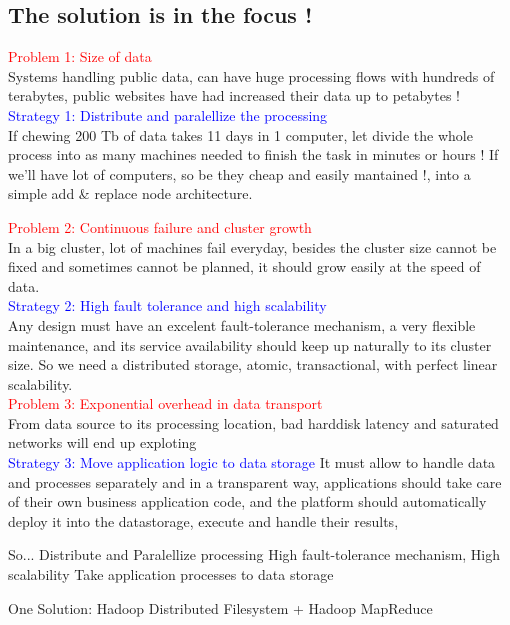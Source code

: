 \subsection{The solution is in the focus !}
\textcolor{red} {Problem 1: Size of data} \\
Systems handling public data, can have huge processing flows with hundreds of terabytes, public websites have had increased their data up to petabytes ! \\
\textcolor{blue} {Strategy 1: Distribute and paralellize the processing} \\
If chewing 200 Tb of data takes 11 days in 1 computer, let divide the whole process into as many machines needed to finish the task in minutes or hours !
If we'll have lot of computers, so be they cheap and easily mantained !, into a simple add \& replace node architecture.

\textcolor{red} {Problem 2: Continuous failure and cluster growth} \\
In a big cluster, lot of machines fail everyday, besides the cluster size cannot be fixed and sometimes cannot be planned, it should grow easily at the speed of data. \\
\textcolor{blue} {Strategy 2: High fault tolerance and high scalability} \\
Any design must have an excelent fault-tolerance mechanism, a very flexible maintenance, and its service availability should keep up naturally to its cluster size.
So we need a distributed storage, atomic, transactional, with perfect linear scalability. \\

\textcolor{red} {Problem 3: Exponential overhead in data transport} \\
From data source to its processing location, bad harddisk latency and saturated networks will end up exploting \\
\textcolor{blue} {Strategy 3: Move application logic to data storage}
It must allow to handle data and processes separately and in a transparent way, applications should take care of their own business application code, and the platform should automatically deploy it into the datastorage, execute and handle their results, 

So...
Distribute and Paralellize processing
High fault-tolerance mechanism, High scalability
Take application processes to data storage

One Solution: Hadoop Distributed Filesystem + Hadoop MapReduce

